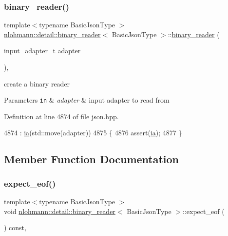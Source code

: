 \subsubsection{\texorpdfstring{binary\+\_\+reader()}{binary\_reader()}}
{\footnotesize\ttfamily template$<$typename Basic\+Json\+Type $>$ \\
\hyperlink{classnlohmann_1_1detail_1_1binary__reader}{nlohmann\+::detail\+::binary\+\_\+reader}$<$ Basic\+Json\+Type $>$\+::\hyperlink{classnlohmann_1_1detail_1_1binary__reader}{binary\+\_\+reader} (\begin{DoxyParamCaption}\item[{\hyperlink{namespacenlohmann_1_1detail_ae132f8cd5bb24c5e9b40ad0eafedf1c2}{input\+\_\+adapter\+\_\+t}}]{adapter }\end{DoxyParamCaption})\hspace{0.3cm}{\ttfamily [inline]}, {\ttfamily [explicit]}}



create a binary reader 


\begin{DoxyParams}[1]{Parameters}
\mbox{\tt in}  & {\em adapter} & input adapter to read from \\
\hline
\end{DoxyParams}


Definition at line 4874 of file json.\+hpp.


\begin{DoxyCode}
4874                                                     : \hyperlink{classnlohmann_1_1detail_1_1binary__reader_adae482b45b2bb733cad3efce034a8b71}{ia}(std::move(adapter))
4875     \{
4876         assert(\hyperlink{classnlohmann_1_1detail_1_1binary__reader_adae482b45b2bb733cad3efce034a8b71}{ia});
4877     \}
\end{DoxyCode}


\subsection{Member Function Documentation}
\mbox{\label{classnlohmann_1_1detail_1_1binary__reader_ad0eebfcfd82778a76e1ae72dec49c25f}} 
\subsubsection{\texorpdfstring{expect\+\_\+eof()}{expect\_eof()}}
{\footnotesize\ttfamily template$<$typename Basic\+Json\+Type $>$ \\
void \hyperlink{classnlohmann_1_1detail_1_1binary__reader}{nlohmann\+::detail\+::binary\+\_\+reader}$<$ Basic\+Json\+Type $>$\+::expect\+\_\+eof (\begin{DoxyParamCaption}{ }\end{DoxyParamCaption}) const\hspace{0.3cm}{\ttfamily [inline]}, {\ttfamily [private]}}



